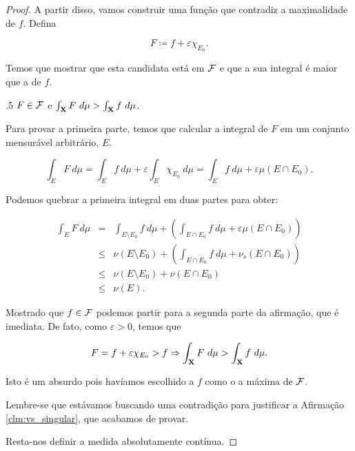\begin{proof}
    A partir disso, vamos construir uma função que contradiz a maximalidade de $f$. Defina

    \begin{equation*}
        F\coloneq f+\varepsilon \chi_{E_0}.
    \end{equation*}

    Temos que mostrar que esta candidata está em $\mathcal{F}$ e que a sua integral é maior que a de $f$.

    \begin{claim}{.}{5}
        $F\in\mathcal{F}$ e $\int_{\X} F \ d\mu > \int_{\X} f \ d\mu$.
    \end{claim}

    Para provar a primeira parte, temos que calcular a integral de $F$ em um conjunto mensurável arbitrário, $E$.

    \begin{equation*}
        \int_E F\ d\mu = \int_E f \ d\mu + \varepsilon \int_E \chi_{E_0} \ d\mu =  \int_E f \ d\mu + \varepsilon\mu(E\cap E_0).
    \end{equation*}

    Podemos quebrar a primeira integral em duas partes para obter:

    \begin{eqnarray*}
        \int_E F\ d\mu &=& \int_{E\setminus E_0} f\ d\mu + \left(\int_{E\cap E_0} f\ d\mu + \varepsilon \mu(E\cap E_0)\right) \\
        &\leq& \nu(E\setminus E_0) + \left(\int_{E\cap E_0} f\ d\mu + \nu_s (E\cap E_0)\right) \\
        &\leq& \nu(E\setminus E_0) + \nu(E\cap E_0)\\
        &\leq& \nu(E).
    \end{eqnarray*}

    Mostrado que $f\in\mathcal{F}$ podemos partir para a segunda parte da afirmação, que é imediata. De fato, como $\varepsilon > 0$, temos que

    \begin{equation*}
        F = f + \varepsilon \chi_{E_0} > f \Rightarrow \int_{\mathbf{X}} F \ d\mu > \int_{\mathbf{X}} f \ d\mu.
    \end{equation*}

    Isto é um absurdo pois havíamos escolhido a $f$ como o a máxima de $\mathcal{F}$.

    Lembre-se que estávamos buscando uma contradição para justificar a Afirmação \ref{clm:vs_singular}, que acabamos de provar.

    Resta-nos definir a medida absolutamente contínua.


\end{proof}
